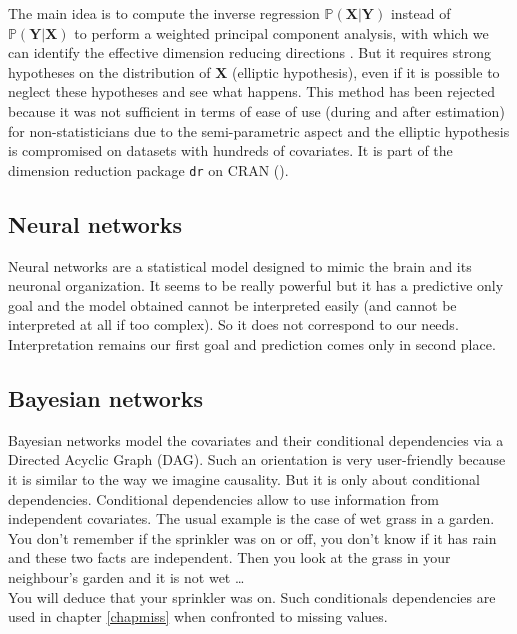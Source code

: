 \documentclass[12pt,a4paper]{report}
\begin{document}
		The main idea is to compute the inverse regression $\mathbb{P}(\boldsymbol{X}|\boldsymbol{Y})$ instead of $\mathbb{P}(\boldsymbol{Y}|\boldsymbol{X})$ to perform a weighted principal component analysis, with which we can identify the effective dimension reducing directions \cite{li1991sliced}. But it requires strong hypotheses on the distribution of $\boldsymbol{X}$ (elliptic hypothesis), even if it is possible to neglect these hypotheses \cite{saracco1999regression} and see what happens. This method has been rejected because it was not sufficient in terms of ease of use (during and after estimation) for non-statisticians due to the semi-parametric aspect and the elliptic hypothesis is compromised on datasets with hundreds of covariates. It is part of the dimension reduction package {\tt dr} on CRAN (\cite{packagedr}).
		
	
	\subsection{Neural networks}	
		Neural networks \cite{fausett1994fundamentals} are a statistical model designed to mimic the brain and its neuronal organization. It seems to be really powerful but it has a predictive only goal and the model obtained cannot be interpreted easily (and cannot be interpreted at all if too complex). So it does not correspond to our needs. Interpretation remains our first goal and prediction comes only in second place.
		
	\subsection{Bayesian networks}
		
		Bayesian networks \cite{heckerman1995learning,jensen2007bayesian,friedman2000using} model the covariates and their conditional dependencies via a Directed Acyclic Graph (DAG). Such an orientation is very user-friendly because it is similar to the way we imagine causality. But it is only about conditional dependencies. Conditional dependencies allow to use information from independent covariates. The usual example is the case of wet grass in a garden. You don't remember if the sprinkler was on or off, you don't know if it has rain and these two facts are independent. Then you look at the grass in your neighbour's garden and it is not wet \dots \\
		You will deduce that your sprinkler was on. Such conditionals dependencies are used in chapter \ref{chapmiss} when confronted to missing values. \\
		
\end{document}

